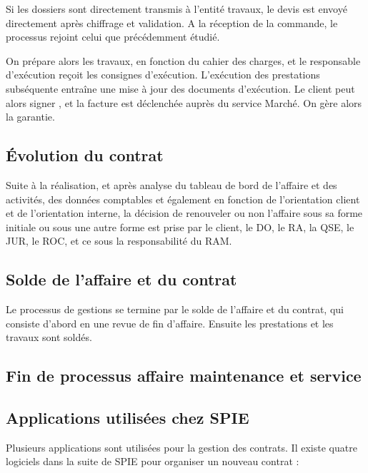 Si les dossiers sont directement transmis à l’entité travaux, le devis est envoyé directement après chiffrage et validation. A la réception de la commande, le processus rejoint celui que précédemment étudié.

On prépare alors les travaux, en fonction du cahier des charges, et le responsable d’exécution reçoit les consignes d’exécution. L’exécution des prestations subséquente entraîne une mise à jour des documents d’exécution. Le client peut alors signer , et la facture est déclenchée auprès du service Marché. On gère alors la garantie.

\subsection{Évolution du contrat}

Suite à la réalisation, et après analyse du tableau de bord de l’affaire et des activités, des données comptables et également en fonction de l’orientation client et de l’orientation interne, la décision de renouveler ou non l’affaire sous sa forme initiale ou sous une autre forme est prise par le client, le DO, le RA, la QSE, le JUR, le ROC, et ce sous la responsabilité du RAM.

\subsection{Solde de l’affaire et du contrat}

Le processus de gestions se termine par le solde de l’affaire et du contrat, qui consiste d’abord en une revue de fin d’affaire. Ensuite les prestations et les travaux sont soldés.

\subsection{Fin de processus affaire maintenance et service}


\subsection{Applications utilisées chez SPIE}

Plusieurs applications sont utilisées pour la gestion des contrats. Il existe quatre logiciels dans la suite de SPIE pour organiser un nouveau contrat :

